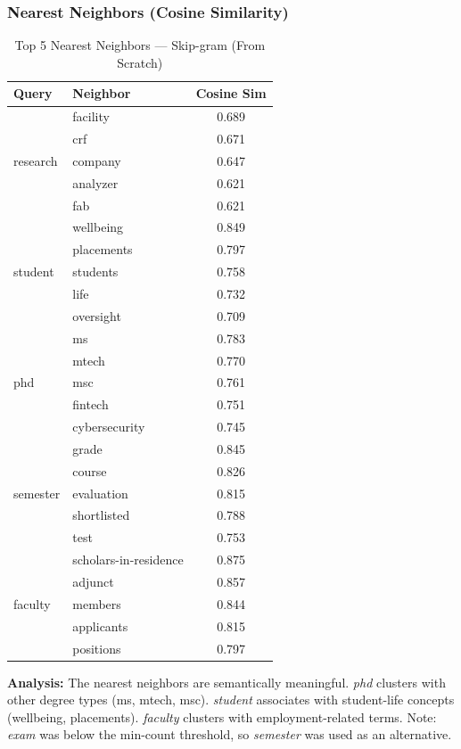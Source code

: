 \documentclass[11pt,a4paper]{article}
\begin{document}
\subsubsection{Nearest Neighbors (Cosine Similarity)}

\begin{table}[H]
\centering
\caption{Top 5 Nearest Neighbors --- Skip-gram (From Scratch)}
\vspace{-0.5em}
\small
\begin{tabular}{llc}
\toprule
\textbf{Query} & \textbf{Neighbor} & \textbf{Cosine Sim} \\
\midrule
\multirow{5}{*}{research} & facility & 0.689 \\
 & crf & 0.671 \\
 & company & 0.647 \\
 & analyzer & 0.621 \\
 & fab & 0.621 \\
\midrule
\multirow{5}{*}{student} & wellbeing & 0.849 \\
 & placements & 0.797 \\
 & students & 0.758 \\
 & life & 0.732 \\
 & oversight & 0.709 \\
\midrule
\multirow{5}{*}{phd} & ms & 0.783 \\
 & mtech & 0.770 \\
 & msc & 0.761 \\
 & fintech & 0.751 \\
 & cybersecurity & 0.745 \\
\midrule
\multirow{5}{*}{semester} & grade & 0.845 \\
 & course & 0.826 \\
 & evaluation & 0.815 \\
 & shortlisted & 0.788 \\
 & test & 0.753 \\
\midrule
\multirow{5}{*}{faculty} & scholars-in-residence & 0.875 \\
 & adjunct & 0.857 \\
 & members & 0.844 \\
 & applicants & 0.815 \\
 & positions & 0.797 \\
\bottomrule
\end{tabular}
\end{table}

\textbf{Analysis:} The nearest neighbors are semantically meaningful. \emph{phd} clusters with other degree types (ms, mtech, msc). \emph{student} associates with student-life concepts (wellbeing, placements). \emph{faculty} clusters with employment-related terms. Note: \emph{exam} was below the min-count threshold, so \emph{semester} was used as an alternative.
\end{document}

